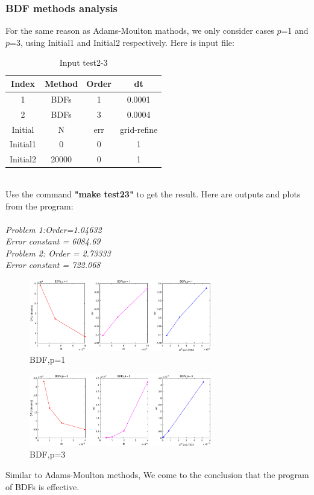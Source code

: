 \documentclass[a4paper,twocolumn]{article}
\theoremstyle{definition}
\begin{document}
\subsubsection{BDF methods analysis}
For the same reason as Adams-Moulton mathods, we only consider cases $p$=1 and $p$=3, using Initial1 and Initial2  respectively. Here is input file:
\begin{table}[!htp]
	\centering
	\begin{tabular}{|c|c|c|c|}
		\hline	
		Index & Method & Order & dt \\
		\hline		
		1 & BDFs & 1 & 0.0001   \\	
		\hline		
		2 & BDFs & 3 & 0.0004   \\	
		\hline \hline
		Initial & N & err & grid-refine \\
		\hline
		Initial1 & 0 & 0 & 1 \\
		\hline
		Initial2 & 20000 & 0 & 1 \\
		\hline
	\end{tabular}
	\caption{Input test2-3}
	\label{tab:test23}
\end{table}\\
Use the command \textbf{"make test23"} to get the result. Here are outputs and plots from the program:\\\\
\emph{Problem 1:Order=1.04632}\\
\emph{Error constant = 6084.69}\\
\emph{Problem 2: Order = 2.73333}\\
\emph{Error constant = 722.068}\\
\begin{figure}[!htp]   
	\centering
	\includegraphics[width=8cm]{Pictures/2_3_1.eps}
	\caption{BDF,p=1}
	\label{fig:BDF1gf}
\end{figure}
\begin{figure}[!htp]   
	\centering
	\includegraphics[width=8cm]{Pictures/2_3_2.eps}
	\caption{BDF,p=3}
	\label{fig:BDF3gf}
\end{figure}
\newpage
\noindent Similar to Adams-Moulton methods, We come to the conclusion that the program of BDFs is effective. 
\end{document}
